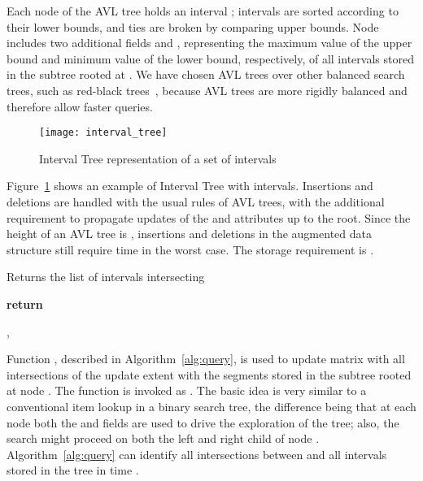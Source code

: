 \documentclass[10pt, conference, compsocconf]{IEEEtran}
\begin{document}
Each node  of the AVL tree holds an interval ;
intervals are sorted according to their lower bounds, and ties are
broken by comparing upper bounds. Node  includes two additional
fields  and , representing
the maximum value of the upper bound and minimum value of the lower
bound, respectively, of all intervals stored in the subtree rooted at
. We have chosen AVL trees over other balanced search trees, such
as red-black trees~\cite{rbtree}, because AVL trees are more rigidly
balanced and therefore allow faster queries.

\begin{figure}[t]
\centering\texttt{[image: interval\_tree]}
\caption{Interval Tree representation of a set of intervals}\label{fig:interval_tree}
\end{figure}

Figure~\ref{fig:interval_tree} shows an example of Interval Tree with
 intervals. Insertions and deletions are handled with the usual
rules of AVL trees, with the additional requirement to propagate
updates of the  and  attributes
up to the root. Since the height of an AVL tree is ,
insertions and deletions in the augmented data structure still require
 time in the worst case. The storage requirement is .

\begin{algorithm}[t]
\caption{Returns the list of intervals intersecting }\label{alg:query}
\begin{algorithmic}

\State \textbf{return}
\EndIf

\State {}

\State , 
\State 
\EndIf

\If{}
\State {}
\EndIf

\EndFunction
\end{algorithmic}
\end{algorithm}

Function , described in
Algorithm~\ref{alg:query}, is used to update matrix  with
all intersections of the update extent  with the segments stored in
the subtree rooted at node . The function is invoked as
. The basic
idea is very similar to a conventional item lookup in a binary search
tree, the difference being that at each node  both the
 and  fields are used to
drive the exploration of the tree; also, the search might proceed on
both the left and right child of node . Algorithm~\ref{alg:query}
can identify all  intersections between  and all  intervals
stored in the tree  in time .
\end{document}
